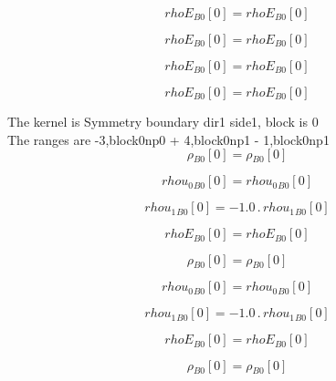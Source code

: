 \documentclass{article}
\begin{document}
\begin{dmath}{rhoE{_{B0}}}[{0}] = {rhoE{_{B0}}}[{0}]\end{dmath}

\begin{dmath}{rhoE{_{B0}}}[{0}] = {rhoE{_{B0}}}[{0}]\end{dmath}

\begin{dmath}{rhoE{_{B0}}}[{0}] = {rhoE{_{B0}}}[{0}]\end{dmath}

\begin{dmath}{rhoE{_{B0}}}[{0}] = {rhoE{_{B0}}}[{0}]\end{dmath}

\noindent The kernel is Symmetry boundary dir1 side1, block is 0\\\noindent The ranges are -3,block0np0 + 4,block0np1 - 1,block0np1\\\begin{dmath}{\rho{_{B0}}}[{0}] = {\rho{_{B0}}}[{0}]\end{dmath}

\begin{dmath}{rhou_{0}{_{B0}}}[{0}] = {rhou_{0}{_{B0}}}[{0}]\end{dmath}

\begin{dmath}{rhou_{1}{_{B0}}}[{0}] = - 1.0 \,.\, {rhou_{1}{_{B0}}}[{0}]\end{dmath}

\begin{dmath}{rhoE{_{B0}}}[{0}] = {rhoE{_{B0}}}[{0}]\end{dmath}

\begin{dmath}{\rho{_{B0}}}[{0}] = {\rho{_{B0}}}[{0}]\end{dmath}

\begin{dmath}{rhou_{0}{_{B0}}}[{0}] = {rhou_{0}{_{B0}}}[{0}]\end{dmath}

\begin{dmath}{rhou_{1}{_{B0}}}[{0}] = - 1.0 \,.\, {rhou_{1}{_{B0}}}[{0}]\end{dmath}

\begin{dmath}{rhoE{_{B0}}}[{0}] = {rhoE{_{B0}}}[{0}]\end{dmath}

\begin{dmath}{\rho{_{B0}}}[{0}] = {\rho{_{B0}}}[{0}]\end{dmath}
\end{document}
